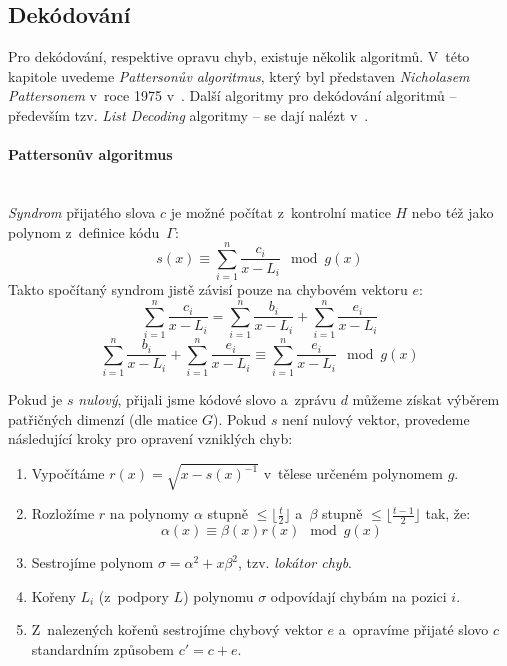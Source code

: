 \documentclass[thesis=M,czech,hidelinks]{FITthesis}[2012/06/26]
\newcommand{\0}{{\textcolor[gray]{0.75}{0}}}
\begin{document}
\subsection{Dekódování}\label{kap_goppa_dekodovani}

Pro dekódování, respektive opravu chyb, existuje několik algoritmů. V~této
kapitole uvedeme \emph{Pattersonův algoritmus}, který byl představen \emph{Nicholasem
Pattersonem} v~roce 1975 v~\cite{Patterson}. Další algoritmy pro dekódování
algoritmů -- především tzv. \emph{List Decoding} algoritmy -- se dají nalézt
v~\cite{Repka,Bernstein2}.

\paragraph{Pattersonův algoritmus} \hfil \\
\emph{Syndrom} přijatého slova $c$ je možné počítat z~kontrolní matice $H$ nebo
též jako polynom z~definice kódu~$\Gamma$:
$$ s(x) \equiv \sum_{i=1}^{n}\frac{c_i}{x-L_i} \mod g(x) $$
Takto spočítaný syndrom jistě závisí pouze na chybovém vektoru $e$:
$$
    \sum_{i=1}^{n}\frac{c_i}{x-L_i} =
    \sum_{i=1}^{n}\frac{b_i}{x-L_i} + \sum_{i=1}^{n}\frac{e_i}{x-L_i}
$$
$$
    \sum_{i=1}^{n}\frac{b_i}{x-L_i} + \sum_{i=1}^{n}\frac{e_i}{x-L_i} \equiv
    \sum_{i=1}^{n}\frac{e_i}{x-L_i} \mod g(x)
$$

Pokud je $s$ \emph{nulový}, přijali jsme kódové slovo a~zprávu $d$ můžeme získat
výběrem patřičných dimenzí (dle matice $G$). Pokud $s$ není nulový vektor,
provedeme následující kroky pro opravení vzniklých chyb:


\begin{enumerate}
    \item Vypočítáme $r(x) = \sqrt{x-s(x)^{-1}}$ v~tělese určeném polynomem $g$.

    \item Rozložíme $r$ na polynomy $\alpha$ stupně $\leq \lfloor\frac{t}{2}\rfloor$
        a~$\beta$ stupně $\leq \lfloor\frac{t-1}{2}\rfloor$ tak, že:
        $$ \alpha(x) \equiv \beta(x) r(x) \mod g(x) $$

    \item Sestrojíme polynom $\sigma = \alpha^2 + x \beta^2$,
        tzv. \emph{lokátor chyb}.

    \item Kořeny $L_i$ (z~podpory $L$) polynomu $\sigma$ odpovídají chybám
        na pozici $i$.

    \item Z~nalezených kořenů sestrojíme chybový vektor $e$ a~opravíme přijaté
        slovo $c$ standardním způsobem $c' = c + e$.
\end{enumerate}
\end{document}
